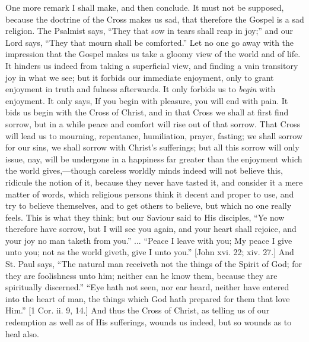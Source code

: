 One more remark I shall make, and then conclude. It
must not be supposed, because the doctrine of the Cross
makes us sad, that therefore the Gospel is a sad
religion. The Psalmist says, ``They that sow in tears
shall reap in joy;'' and our Lord says, ``They
that mourn shall be comforted.'' Let no one go away
with the impression that the Gospel makes us take a
gloomy view of the world and of life. It hinders us
indeed from taking a superficial view, and finding a vain
transitory joy in what we see; but it forbids our
immediate enjoyment, only to grant enjoyment in truth and
fulness afterwards. It only forbids us to \emph{begin} with
enjoyment. It only says, If you begin with pleasure, you
will end with pain. It bids us begin with the Cross of
Christ, and in that Cross we shall at first find sorrow,
but in a while peace and comfort will rise out of that
sorrow. That Cross will lead us to mourning, repentance,
humiliation, prayer, fasting; we shall sorrow for our
sins, we shall sorrow with Christ's sufferings; but all
this sorrow will only issue, nay, will be undergone in a
happiness far greater than the enjoyment which the world
gives,—though careless worldly minds indeed will not
believe this, ridicule the notion of it, because they
never have tasted it, and consider it a mere matter of
words, which religious persons think it decent and proper
to use, and try to believe themselves, and to get others
to believe, but which no one really feels. This is what
they think; but our Saviour said to His disciples,
``Ye now therefore have sorrow, but I will see you
again, and your heart shall rejoice, and your joy no man
taketh from you.'' ... ``Peace I leave with you;
My peace I give unto you; not as the world giveth, give I
unto you.'' [John xvi. 22; xiv. 27.] And St. Paul
says, ``The natural man receiveth not the things of
the Spirit of God; for they are foolishness unto him;
neither can he know them, because they are spiritually
discerned.'' ``Eye hath not seen, nor ear heard,
neither have entered into the heart of man, the things
which God hath prepared for them that love Him.'' [1
Cor. ii. 9, 14.] And thus the Cross of Christ, as telling
us of our redemption as well as of His sufferings, wounds
us indeed, but so wounds as to heal also.

